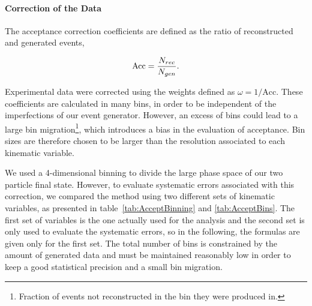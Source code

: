 \paragraph{Correction of the Data}

The acceptance correction coefficients are defined as the ratio of reconstructed and generated events,

\begin{equation}
\label{eq:acc}
\text{Acc} = {N_{rec} \over N_{gen}}.
\end{equation}

Experimental data were corrected using the weights defined as $\omega = 1/\text{Acc}$. These 
coefficients are calculated in many bins, in order to be independent of the imperfections of 
our event generator. However, an excess of bins could lead to a large bin 
migration\footnote{Fraction of events not reconstructed in the bin they were produced in.}, 
which introduces a bias in the evaluation of acceptance. Bin sizes are therefore chosen to
be larger than the resolution associated to each kinematic variable.

We used a 4-dimensional binning to divide the large phase space of our two particle final 
state. However, to evaluate systematic errors associated with this correction, we compared the
method using two different sets of kinematic variables, as presented in 
table~\ref{tab:AcceptBinning} and \ref{tab:AcceptBins}. The first set of variables is the one actually used for the
analysis and the second set is only used to evaluate the systematic errors, so in the 
following, the formulas are given only for the first set. The total number of bins is 
constrained by the amount of generated data and must be maintained reasonably low in order 
to keep a good statistical precision and a small bin migration.

